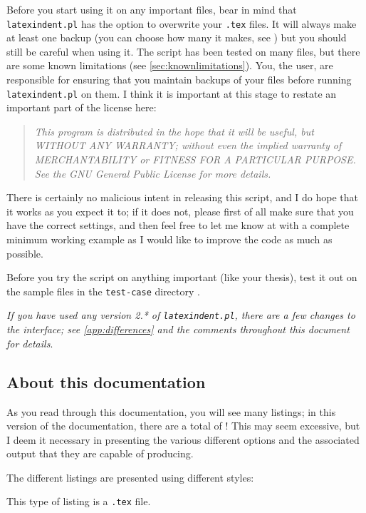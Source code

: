 	Before you start using it on any important files, bear in mind that \texttt{latexindent.pl} has the option to overwrite your \texttt{.tex} files.
	It will always make at least one backup (you can choose how many it makes, see )
	but you should still be careful when using it. The script has been tested on many
	files, but there are some known limitations (see \cref{sec:knownlimitations}).
	You, the user, are responsible for ensuring that you maintain backups of your files
	before running \texttt{latexindent.pl} on them. I think it is important at this
	stage to restate an important part of the license here:
	\begin{quote}\itshape
		This program is distributed in the hope that it will be useful,
		but WITHOUT ANY WARRANTY; without even the implied warranty of
		MERCHANTABILITY or FITNESS FOR A PARTICULAR PURPOSE.  See the
		GNU General Public License for more details.
	\end{quote}
	There is certainly no malicious intent in releasing this script, and I do hope
	that it works as you expect it to; if it does not, please first of all
	make sure that you have the correct settings, and then feel free to let me know at \cite{latexindent-home} with a
	complete minimum working example as I would like to improve the code as much as possible.
	\begin{warning}
		Before you try the script on anything important (like your thesis), test it
		out on the sample files in the \texttt{test-case} directory \cite{latexindent-home}.
	\end{warning}

	\emph{If you have used any version 2.* of \texttt{latexindent.pl}, there
		are a few changes to the interface; see \vref{app:differences} and the comments
		throughout this document for details}.

\subsection{About this documentation}
	As you read through this documentation, you will see many listings; in this version of the documentation,
	there are a total of \totallstlistings! This may seem excessive, but I deem it necessary in
	presenting the various different options and the associated output that they are capable of
	producing.

	The different listings are presented using different styles:

	\begin{minipage}{.4\textwidth}
	\end{minipage}%
	\hfill
	\begin{minipage}{.4\textwidth}
		This type of listing is a \texttt{.tex} file.
	\end{minipage}%

